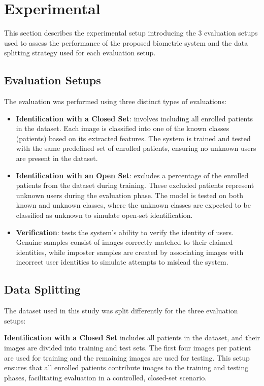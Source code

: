 \section{Experimental}
This section describes the experimental setup introducing the 3 evaluation setups used to assess the performance of the proposed biometric system and the data splitting strategy used for each evaluation setup.

\subsection{Evaluation Setups}
The evaluation was performed using three distinct types of evaluations:

\begin{itemize}
    \item \textbf{Identification with a Closed Set}: involves including all enrolled patients in the dataset. Each image is classified into one of the known classes (patients) based on its extracted features. The system is trained and tested with the same predefined set of enrolled patients, ensuring no unknown users are present in the dataset.

    \item \textbf{Identification with an Open Set}: excludes a percentage of the enrolled patients from the dataset during training. These excluded patients represent unknown users during the evaluation phase. The model is tested on both known and unknown classes, where the unknown classes are expected to be classified as unknown to simulate open-set identification.

    \item \textbf{Verification}: tests the system's ability to verify the identity of users. Genuine samples consist of images correctly matched to their claimed identities, while imposter samples are created by associating images with incorrect user identities to simulate attempts to mislead the system.
\end{itemize}

\subsection{Data Splitting}
The dataset used in this study was split differently for the three evaluation setups:

\textbf{Identification with a Closed Set} includes all patients in the dataset, and their images are divided into training and test sets. The first four images per patient are used for training and the remaining images are used for testing. This setup ensures that all enrolled patients contribute images to the training and testing phases, facilitating evaluation in a controlled, closed-set scenario.

